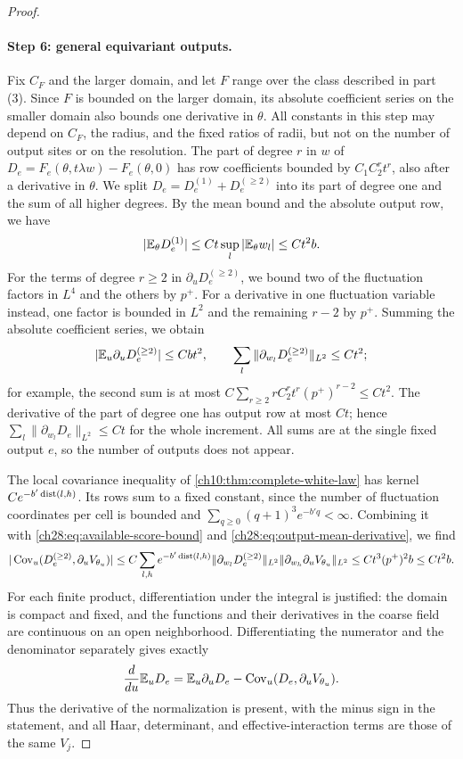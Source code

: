 \begin{proof}
\paragraph{Step 6: general equivariant outputs.}
Fix $C_F$ and the larger domain, and let $F$ range over the class described in part (3). Since $F$ is bounded on the larger domain, its absolute coefficient series on the smaller domain also bounds one derivative in $\theta$. All constants in this step may depend on $C_F$, the radius, and the fixed ratios of radii, but not on the number of output sites or on the resolution. The part of degree $r$ in $w$ of $D_e=F_e(\theta,t\lambda w)-F_e(\theta,0)$ has row coefficients bounded by $C_1C_2^rt^r$, also after a derivative in $\theta$. We split $D_e=D_e^{(1)}+D_e^{(\ge2)}$ into its part of degree one and the sum of all higher degrees. By the mean bound and the absolute output row, we have
\[
 |\mathbb E_\theta D_e^{(1)}|\le Ct\sup_l|\mathbb E_\theta w_l|\le Ct^2b.
\]
For the terms of degree $r\ge2$ in $\partial_uD_e^{(\ge2)}$, we bound two of the fluctuation factors in $L^4$ and the others by $p^+$. For a derivative in one fluctuation variable instead, one factor is bounded in $L^2$ and the remaining $r-2$ by $p^+$. Summing the absolute coefficient series, we obtain
\begin{equation}\label{ch28:eq:output-mean-derivative}
 |\mathbb E_u\partial_uD_e^{(\ge2)}|\le Cbt^2,\qquad \sum_l\|\partial_{w_l}D_e^{(\ge2)}\|_{L^2}\le Ct^2;
\end{equation}
for example, the second sum is at most $C\sum_{r\ge2}rC_2^rt^r(p^+)^{r-2}\le Ct^2$. The derivative of the part of degree one has output row at most $Ct$; hence $\sum_l\|\partial_{w_l}D_e\|_{L^2}\le Ct$ for the whole increment. All sums are at the single fixed output $e$, so the number of outputs does not appear.

The local covariance inequality of \cref{ch10:thm:complete-white-law} has kernel $Ce^{-b'\operatorname{dist}(l,h)}$. Its rows sum to a fixed constant, since the number of fluctuation coordinates per cell is bounded and $\sum_{q\ge0}(q+1)^3e^{-b'q}<\infty$. Combining it with \eqref{ch28:eq:available-score-bound} and \eqref{ch28:eq:output-mean-derivative}, we find
\[
 |\operatorname{Cov}_u(D_e^{(\ge2)},\partial_uV_{\theta_u})|\le C\sum_{l,h}e^{-b'\operatorname{dist}(l,h)}\|\partial_{w_l}D_e^{(\ge2)}\|_{L^2}\|\partial_{w_h}\partial_uV_{\theta_u}\|_{L^2}\le Ct^3(p^+)^2b\le Ct^2b.
\]
For each finite product, differentiation under the integral is justified: the domain is compact and fixed, and the functions and their derivatives in the coarse field are continuous on an open neighborhood. Differentiating the numerator and the denominator separately gives exactly
\[
 \frac d{du}\mathbb E_uD_e=\mathbb E_u\partial_uD_e-\operatorname{Cov}_u(D_e,\partial_uV_{\theta_u}).
\]
Thus the derivative of the normalization is present, with the minus sign in the statement, and all Haar, determinant, and effective-interaction terms are those of the same $V_j$.


\end{proof}
